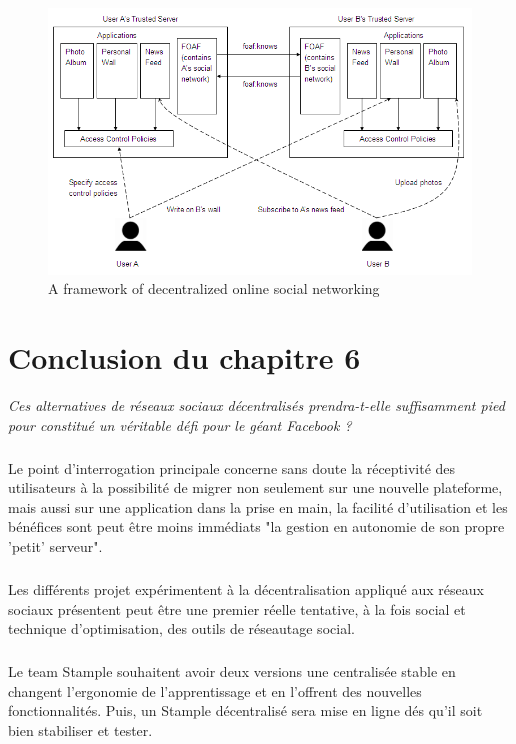 \begin{figure}
        \centering
                \centering
                \includegraphics[width=\textwidth]{framework.png}
                \caption{A framework of decentralized online social networking}
                \label{fig:A framework of decentralized online social networking}
       
\end{figure}
\newpage
\section{Conclusion du chapitre 6}
\textit{Ces alternatives de réseaux sociaux décentralisés prendra-t-elle suffisamment pied pour constitué un véritable défi pour le géant Facebook ?}
\subparagraph{}
Le point d'interrogation principale concerne sans doute la réceptivité des utilisateurs à la possibilité de migrer non seulement sur une nouvelle plateforme, mais aussi sur une application dans la prise en main, la facilité d'utilisation et les bénéfices sont peut être moins immédiats "la gestion en autonomie de son propre 'petit' serveur".
\subparagraph{}
Les différents projet expérimentent à la décentralisation appliqué aux réseaux sociaux présentent peut être une premier réelle tentative, à la fois social et technique d'optimisation, des outils de réseautage social.
\subparagraph{}
Le team Stample souhaitent avoir deux versions une centralisée stable en changent l'ergonomie de l'apprentissage et en l'offrent des nouvelles fonctionnalités. Puis, un Stample décentralisé sera mise en ligne dés qu'il soit bien stabiliser et tester.  



